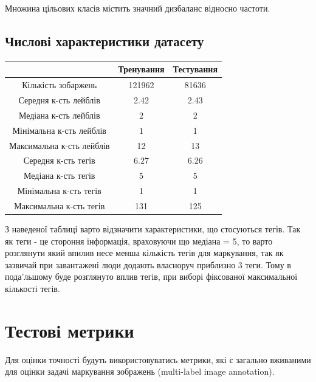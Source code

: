 \documentclass{udstu}
\begin{document}
Множина цільових класів містить значний дизбаланс відносно частоти.

\clearpage

\subsection{Числові характеристики датасету}

\begin{center}
\begin{tabular}{|c|c|c|}
		\hline
           & Тренування & Тестування \\
        \hline
        Кількість зобаржень & 121962  & 81636 \\
        Середня к-сть лейблів & 2.42  & 2.43 \\
        Медіана к-сть лейблів & 2  & 2 \\
        Мінімальна к-сть лейблів & 1  & 1 \\
        Максимальна к-сть лейблів & 12  & 13 \\
        Середня к-сть тегів & 6.27  & 6.26 \\
        Медіана к-сть тегів & 5  & 5 \\
        Мінімальна к-сть тегів & 1  & 1 \\
        Максимальна к-сть тегів & 131  & 125 \\
        \hline
\end{tabular}
\end{center}

З наведеної таблиці варто відзначити характеристики, що стосуються тегів. Так як теги - це
стороння інформація, враховуючи що медіана = 5, то варто розглянути який впилив несе менша кількість
тегів для маркування, так як зазвичай при завантажені люди додають власноруч приблизно 3 теги.
Тому в пода'льшому буде розглянуто вплив тегів, при виборі фіксованої максимальної кількості тегів.

\clearpage


\section{Тестові метрики}
\label{metrics}

Для оцінки точності будуть використовуватись метрики, які є загально вживаними для оцінки
задачі маркування зображень (multi-label image annotation).
\end{document}
